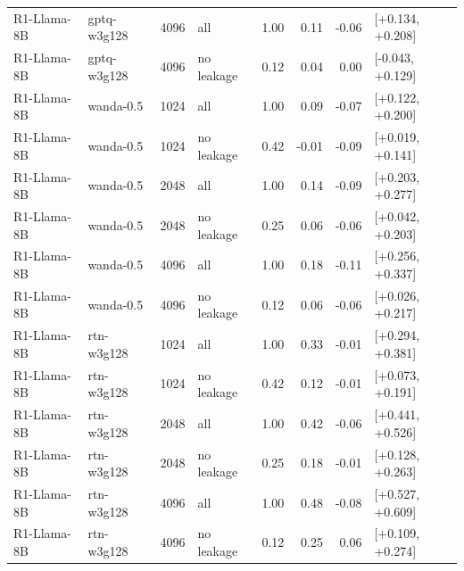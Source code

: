 \begin{tabular}{llrlrrrl}
R1-Llama-8B & gptq-w3g128 & 4096 & all & 1.00 & 0.11 & -0.06 & [+0.134, +0.208] \\
R1-Llama-8B & gptq-w3g128 & 4096 & no leakage & 0.12 & 0.04 & 0.00 & [-0.043, +0.129] \\
R1-Llama-8B & wanda-0.5 & 1024 & all & 1.00 & 0.09 & -0.07 & [+0.122, +0.200] \\
R1-Llama-8B & wanda-0.5 & 1024 & no leakage & 0.42 & -0.01 & -0.09 & [+0.019, +0.141] \\
R1-Llama-8B & wanda-0.5 & 2048 & all & 1.00 & 0.14 & -0.09 & [+0.203, +0.277] \\
R1-Llama-8B & wanda-0.5 & 2048 & no leakage & 0.25 & 0.06 & -0.06 & [+0.042, +0.203] \\
R1-Llama-8B & wanda-0.5 & 4096 & all & 1.00 & 0.18 & -0.11 & [+0.256, +0.337] \\
R1-Llama-8B & wanda-0.5 & 4096 & no leakage & 0.12 & 0.06 & -0.06 & [+0.026, +0.217] \\
R1-Llama-8B & rtn-w3g128 & 1024 & all & 1.00 & 0.33 & -0.01 & [+0.294, +0.381] \\
R1-Llama-8B & rtn-w3g128 & 1024 & no leakage & 0.42 & 0.12 & -0.01 & [+0.073, +0.191] \\
R1-Llama-8B & rtn-w3g128 & 2048 & all & 1.00 & 0.42 & -0.06 & [+0.441, +0.526] \\
R1-Llama-8B & rtn-w3g128 & 2048 & no leakage & 0.25 & 0.18 & -0.01 & [+0.128, +0.263] \\
R1-Llama-8B & rtn-w3g128 & 4096 & all & 1.00 & 0.48 & -0.08 & [+0.527, +0.609] \\
R1-Llama-8B & rtn-w3g128 & 4096 & no leakage & 0.12 & 0.25 & 0.06 & [+0.109, +0.274] \\
\bottomrule
\end{tabular}
